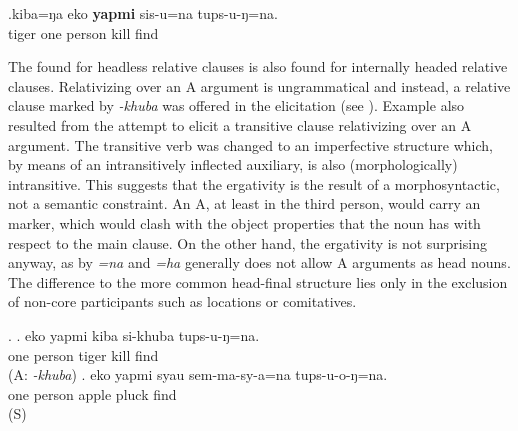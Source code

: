 \exg.kiba=ŋa  eko \textbf{yapmi} sis-u=na tups-u-ŋ=na.\\
tiger one person kill find\\ 


The   found for headless relative clauses is also found for internally headed relative clauses. Relativizing over an A argument is ungrammatical and instead, a relative clause marked by \emph{-khuba} was offered in the elicitation (see \Next[a]). Example \Next[b] also resulted from the attempt to elicit a transitive clause relativizing over an A argument. The transitive verb was changed to an imperfective structure which, by means of an intransitively inflected auxiliary, is also  (morphologically) intransitive. This suggests that the ergativity is the result of a  morphosyntactic, not a semantic constraint. An  A, at least in the third person, would carry an  marker, which would clash with the object properties that the noun has with respect to the main clause. On the other hand, the ergativity is not surprising anyway, as  by \emph{=na} and \emph{=ha} generally does not allow A arguments as head nouns. The difference to the more common head-final structure lies only in the exclusion  of non-core participants such as locations or comitatives.


\ex. \ag. eko  yapmi kiba si-khuba tups-u-ŋ=na.\\
one person tiger kill find\\
 (A: \emph{-khuba})
\bg. eko yapmi syau sem-ma-sy-a=na tups-u-o-ŋ=na.\\
one person apple pluck find\\
 (S)


